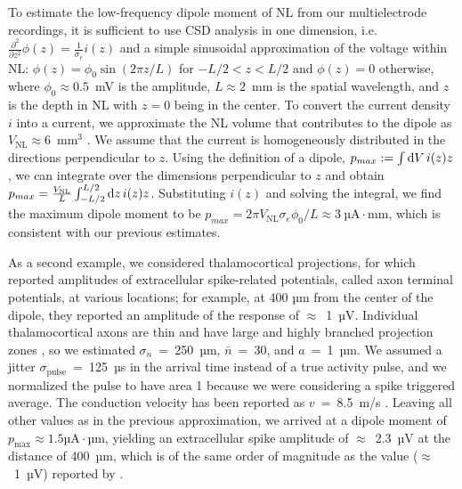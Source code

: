 \documentclass[]{elife}
\begin{document}
To estimate the low-frequency dipole moment of NL from our
multielectrode recordings, it is sufficient to use CSD analysis in one
dimension, i.e.
\(\frac{\partial ^2}{\partial z^2} \phi(z) = \frac{1}{\sigma_e} i(z)\)
and a simple sinusoidal approximation of the voltage within NL:
\(\phi(z) = \phi_0 \sin(2\pi z / L)\) for \(-L/2 < z < L/2\) and
\(\phi(z) = 0\) otherwise, where \(\phi_0 \approx 0.5\)~mV is the
amplitude, \(L \approx 2\)~mm is the spatial wavelength, and \(z\) is
the depth in NL with \(z=0\) being in the center. To convert the current
density \(i\) into a current, we approximate the NL volume that
contributes to the dipole as \(V_{\text{NL}} \approx 6\)~mm\(^3\)
\citep{Kuokkanen2010Origin}. We assume that the current is homogeneously
distributed in the directions perpendicular to \(z\). Using the
definition of a dipole, \(p_{max} := \int {\rm d} V \, i(z) z\), we can
integrate over the dimensions perpendicular to \(z\) and obtain
\(p_{max} = \frac{V_{\text{NL}}}{L} \int_{-L/2}^{L/2} {\rm d} z \, i(z) z\).
Substituting \(i(z)\) and solving the integral, we find the maximum
dipole moment to be
\(p_{max} = 2 \pi V_{\text{NL}} \sigma_e \phi_0 /L \approx 3\ \text{µA}\cdot\text{mm}\),
which is consistent with our previous estimates.

As a second example, we considered thalamocortical projections, for
which \citet{Swadlow2000Influence} reported amplitudes of extracellular
spike-related potentials, called axon terminal potentials, at various
locations; for example, at 400 µm from the center of the dipole, they
reported an amplitude of the response of \(\approx\)~1~µV. Individual
thalamocortical axons are thin and have large and highly branched
projection zones \citep{Feldmeyer2012Excitatory}, so we estimated
\(\sigma_n\)~=~250~µm, \(\bar{n}\)~=~30, and \(a\)~=~1~µm. We assumed a
jitter \(\sigma_\text{pulse}\)~=~125~µs in the arrival time instead of a
true activity pulse, and we normalized the pulse to have area 1 because
we were considering a spike triggered average. The conduction velocity
has been reported as \(v\)~=~8.5~m/s \citep{Simons2007Thalamocortical}.
Leaving all other values as in the previous approximation, we arrived at
a dipole moment of \(p_\text{max} \approx 1.5 \text{µA}\cdot\text{µm}\),
yielding an extracellular spike amplitude of \(\approx\)~2.3~µV at the
distance of 400~µm, which is of the same order of magnitude as the value
(\(\approx\)~1~µV) reported by \citet{Swadlow2000Influence}.
\end{document}
